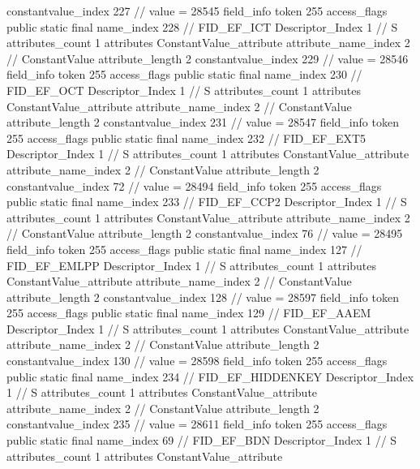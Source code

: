 {{{{{{{					constantvalue_index	227		// value = 28545
				}
				}
			}
			field_info {
				token	255
				access_flags	public static final
				name_index	228		// FID_EF_ICT
				Descriptor_Index	1		// S
				attributes_count	1
				attributes {
				ConstantValue_attribute {
					attribute_name_index	2		// ConstantValue
					attribute_length	2
					constantvalue_index	229		// value = 28546
				}
				}
			}
			field_info {
				token	255
				access_flags	public static final
				name_index	230		// FID_EF_OCT
				Descriptor_Index	1		// S
				attributes_count	1
				attributes {
				ConstantValue_attribute {
					attribute_name_index	2		// ConstantValue
					attribute_length	2
					constantvalue_index	231		// value = 28547
				}
				}
			}
			field_info {
				token	255
				access_flags	public static final
				name_index	232		// FID_EF_EXT5
				Descriptor_Index	1		// S
				attributes_count	1
				attributes {
				ConstantValue_attribute {
					attribute_name_index	2		// ConstantValue
					attribute_length	2
					constantvalue_index	72		// value = 28494
				}
				}
			}
			field_info {
				token	255
				access_flags	public static final
				name_index	233		// FID_EF_CCP2
				Descriptor_Index	1		// S
				attributes_count	1
				attributes {
				ConstantValue_attribute {
					attribute_name_index	2		// ConstantValue
					attribute_length	2
					constantvalue_index	76		// value = 28495
				}
				}
			}
			field_info {
				token	255
				access_flags	public static final
				name_index	127		// FID_EF_EMLPP
				Descriptor_Index	1		// S
				attributes_count	1
				attributes {
				ConstantValue_attribute {
					attribute_name_index	2		// ConstantValue
					attribute_length	2
					constantvalue_index	128		// value = 28597
				}
				}
			}
			field_info {
				token	255
				access_flags	public static final
				name_index	129		// FID_EF_AAEM
				Descriptor_Index	1		// S
				attributes_count	1
				attributes {
				ConstantValue_attribute {
					attribute_name_index	2		// ConstantValue
					attribute_length	2
					constantvalue_index	130		// value = 28598
				}
				}
			}
			field_info {
				token	255
				access_flags	public static final
				name_index	234		// FID_EF_HIDDENKEY
				Descriptor_Index	1		// S
				attributes_count	1
				attributes {
				ConstantValue_attribute {
					attribute_name_index	2		// ConstantValue
					attribute_length	2
					constantvalue_index	235		// value = 28611
				}
				}
			}
			field_info {
				token	255
				access_flags	public static final
				name_index	69		// FID_EF_BDN
				Descriptor_Index	1		// S
				attributes_count	1
				attributes {
				ConstantValue_attribute {
}}}}}}}
